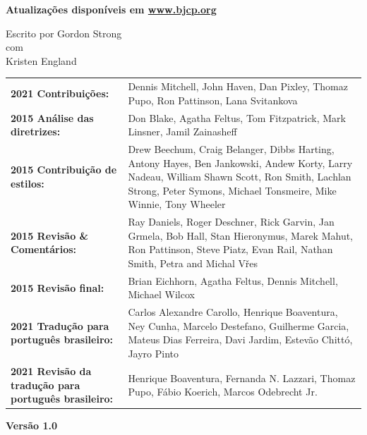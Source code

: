 \begin{titlepage}
        \vspace{0.5cm}

        {\fontsize{12}{32}\selectfont \textbf{Atualizações disponíveis em \href{http://www.bjcp.org}{www.bjcp.org}}}\\

        \vspace{0.5cm}

        {\fontsize{12}{32}\selectfont Escrito por Gordon Strong}\\
        {\fontsize{9}{32}\selectfont com}\\
        {\fontsize{10}{32}\selectfont Kristen England}\\

        \vspace{0.5cm}

        \begin{tabular}{ m{5.5cm} m{12.5cm} }
            \textbf{2021 Contribuições:}	& Dennis Mitchell, John Haven, Dan Pixley, Thomaz Pupo, Ron Pattinson, Lana Svitankova \\
            \textbf{2015 Análise das diretrizes:} & Don Blake, Agatha Feltus, Tom Fitzpatrick, Mark Linsner, Jamil Zainasheff \\
            \textbf{2015 Contribuição de estilos:} & Drew Beechum, Craig Belanger, Dibbs Harting, Antony Hayes, Ben Jankowski, Andew Korty,
            Larry Nadeau, William Shawn Scott, Ron Smith, Lachlan Strong, Peter Symons, Michael Tonsmeire, Mike Winnie, Tony Wheeler \\
            \textbf{2015 Revisão \& Comentários:} & Ray Daniels, Roger Deschner, Rick Garvin, Jan Grmela, Bob Hall, Stan Hieronymus, Marek Mahut, Ron Pattinson, Steve Piatz, Evan Rail, Nathan Smith, Petra and Michal Vřes\\
            \textbf{2015 Revisão final:} & Brian Eichhorn, Agatha Feltus, Dennis Mitchell, Michael Wilcox  \\
            \textbf{2021 Tradução para português brasileiro:} & Carlos Alexandre Carollo, Henrique Boaventura, Ney Cunha, Marcelo Destefano,  Guilherme Garcia, Mateus Dias Ferreira, Davi Jardim, Estevão Chittó, Jayro Pinto \\
            \textbf{2021 Revisão da tradução para português brasileiro:} & Henrique Boaventura, Fernanda N. Lazzari, Thomaz Pupo, Fábio Koerich, Marcos Odebrecht Jr.
        \end{tabular}

        \vspace{0.5cm}

        \textbf{Versão 1.0}\\

\end{titlepage}